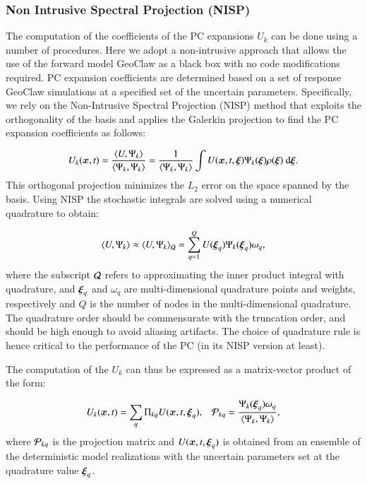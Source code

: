 \documentclass[review,12pt]{elsarticle}
\newcommand{\xxi}{\vec{\xi}}
\renewcommand{\vec}[1]{{\mathchoice
                     {\mbox{\boldmath$\displaystyle{#1}$}}
                     {\mbox{\boldmath$\textstyle{#1}$}}
                     {\mbox{\boldmath$\scriptstyle{#1}$}}
                     {\mbox{\boldmath$\scriptscriptstyle{#1}$}}}}
\newcommand{\geoclaw}{{\sc GeoClaw}\xspace}
\begin{document}
\subsubsection{Non Intrusive Spectral Projection (NISP)}
The computation of the coefficients of the PC expansions $U_k$
can be done using a number of procedures. Here we adopt a non-intrusive
approach that allows the use of the forward model \geoclaw as a black box
with no code modifications required. PC expansion coefficients are determined
based on a set of response \geoclaw simulations at a specified set of the uncertain parameters. 
Specifically, we rely on the Non-Intrusive Spectral Projection (NISP) method that exploits the orthogonality of the basis and applies the Galerkin projection to find the PC expansion coefficients as follows:

\begin{equation}
 U_k(\bm{x},t) = \frac{\left< U, \Psi_k \right>}{\left< \Psi_k, \Psi_k \right>} = 
 \frac{1}{\left< \Psi_k, \Psi_k \right>} 
 \int U(\bm{x},t,\xxi) \Psi_k(\xxi) \rho(\xxi) \mbox{ d}\xxi.
\end{equation}
This orthogonal projection minimizes the $L_2$ error on the space spanned by the basis.
Using NISP the stochastic integrals are solved using a numerical quadrature to obtain:

\begin{equation}
  \left< U, \Psi_k \right> 
\approx \left< U, \Psi_k \right>_{\cal Q}
= \sum_{q=1}^{Q} U(\xxi_q) \Psi_k(\xxi_q) \omega_q,
\end{equation}
where the subscript $\cal Q$ refers to approximating the inner product integral with
quadrature, and $\xxi_q$ and $\omega_q$ are multi-dimensional quadrature points and weights,
respectively and $Q$ is the number of nodes in the multi-dimensional quadrature. The quadrature order should be commensurate with the
truncation order, and should be high enough to avoid aliasing artifacts.
The choice of quadrature rule is hence critical to the performance
of the PC (in its NISP version at least).

The computation of the ${U}_k$ can thus be expressed as a matrix-vector product of the form:

\begin{equation} 
 U_k(\bm{x},t)=\sum_q \Pi_{kq} U(\bm{x},t,\xxi_q),\;\;\;
 {\cal P}_{kq}=\frac{\Psi_k(\xxi_q)\omega_q}{\left< \Psi_k, \Psi_k \right>},
\label{eq:nisp}
\end{equation} 
where ${\cal P}_{kq}$ is the projection matrix and $U(\bm{x},t,\xxi_q)$ is obtained
from an ensemble of the deterministic model realizations with the uncertain parameters set at
the quadrature value $\xxi_q$. 
\end{document}
